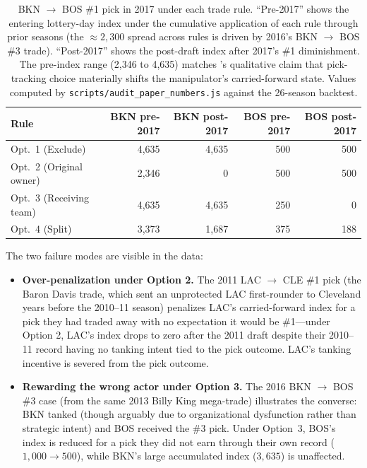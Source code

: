 \begin{table}[t]
\centering
\footnotesize
\begin{tabular}{lrrrr}
\toprule
Rule & BKN pre-2017 & BKN post-2017 & BOS pre-2017 & BOS post-2017 \\
\midrule
Opt.\ 1 (Exclude)         & 4{,}635 & 4{,}635 & 500 & 500 \\
Opt.\ 2 (Original owner)  & 2{,}346 &     0   & 500 & 500 \\
Opt.\ 3 (Receiving team)  & 4{,}635 & 4{,}635 & 250 &   0 \\
Opt.\ 4 (Split)           & 3{,}373 & 1{,}687 & 375 & 188 \\
\bottomrule
\end{tabular}
\caption{BKN $\to$ BOS \#1 pick in 2017 under each trade rule. ``Pre-2017'' shows the entering lottery-day index under the cumulative application of each rule through prior seasons (the $\approx\!2{,}300$ spread across rules is driven by 2016's BKN $\to$ BOS \#3 trade). ``Post-2017'' shows the post-draft index after 2017's \#1 diminishment. The pre-index range (2{,}346 to 4{,}635) matches \citet{highley2026solvable4}'s qualitative claim that pick-tracking choice materially shifts the manipulator's carried-forward state. Values computed by \texttt{scripts/audit\_paper\_numbers.js} against the 26-season backtest.}
\label{tab:trade-options}
\end{table}

The two failure modes are visible in the data:

\begin{itemize}
    \item \textbf{Over-penalization under Option 2.} The 2011 LAC $\to$ CLE \#1 pick (the Baron Davis trade, which sent an unprotected LAC first-rounder to Cleveland years before the 2010--11 season) penalizes LAC's carried-forward index for a pick they had traded away with no expectation it would be \#1---under Option 2, LAC's index drops to zero after the 2011 draft despite their 2010--11 record having no tanking intent tied to the pick outcome. LAC's tanking incentive is severed from the pick outcome.
    \item \textbf{Rewarding the wrong actor under Option 3.} The 2016 BKN $\to$ BOS \#3 case (from the same 2013 Billy King mega-trade) illustrates the converse: BKN tanked (though arguably due to organizational dysfunction rather than strategic intent) and BOS received the \#3 pick. Under Option~3, BOS's index is reduced for a pick they did not earn through their own record ($1{,}000 \to 500$), while BKN's large accumulated index ($3{,}635$) is unaffected.
\end{itemize}

